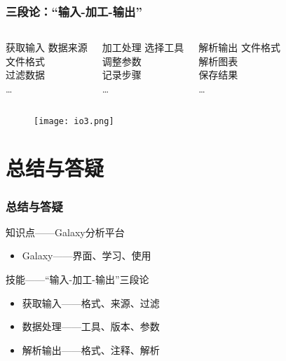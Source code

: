 \begin{frame}
  \frametitle{三段论：“输入-加工-输出”}
  \begin{columns}
    \begin{block}{获取输入}
      数据来源\\ 文件格式\\ 过滤数据\\ \ldots
    \end{block}
    \begin{block}{加工处理}
      选择工具\\ 调整参数\\ 记录步骤\\ \ldots
    \end{block}
    \begin{block}{解析输出}
      文件格式\\ 解析图表\\ 保存结果\\ \ldots
    \end{block}
  \end{columns}
  \begin{figure}
    \centering
    \texttt{[image: io3.png]}
  \end{figure}
\end{frame}

\section{总结与答疑}
\begin{frame}
  \frametitle{总结与答疑}
  \begin{block}{知识点——Galaxy分析平台}
    \begin{itemize}
      \item Galaxy——界面、学习、使用
    \end{itemize}
  \end{block}
  \begin{block}{技能——“输入-加工-输出”三段论}
    \begin{itemize}
      \item 获取输入——格式、来源、过滤
      \item 数据处理——工具、版本、参数
      \item 解析输出——格式、注释、解析
    \end{itemize}
  \end{block}
\end{frame}

